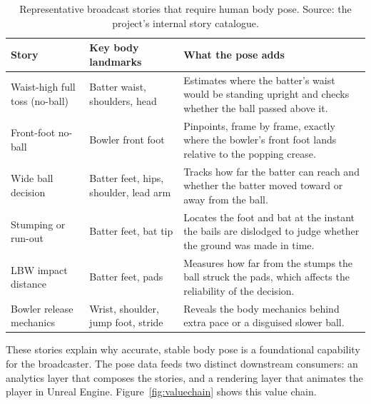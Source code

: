 \documentclass[oneside,openany]{book}
\begin{document}
\begin{table}[!h]
	\begin{center}
		\caption{Representative broadcast stories that require human body pose. Source: the
		project's internal story catalogue.}
		\label{tab:stories}
		\footnotesize
		\begin{tabular}{p{3.4cm}p{4.0cm}p{6.6cm}}
			\toprule
			\textbf{Story} & \textbf{Key body landmarks} & \textbf{What the pose adds} \\
			\midrule
			Waist-high full toss (no-ball) & Batter waist, shoulders, head & Estimates where the
			batter's waist would be standing upright and checks whether the ball passed above it. \\
			Front-foot no-ball & Bowler front foot & Pinpoints, frame by frame, exactly where the
			bowler's front foot lands relative to the popping crease. \\
			Wide ball decision & Batter feet, hips, shoulder, lead arm & Tracks how far the batter
			can reach and whether the batter moved toward or away from the ball. \\
			Stumping or run-out & Batter feet, bat tip & Locates the foot and bat at the instant the
			bails are dislodged to judge whether the ground was made in time. \\
			LBW impact distance & Batter feet, pads & Measures how far from the stumps the ball
			struck the pads, which affects the reliability of the decision. \\
			Bowler release mechanics & Wrist, shoulder, jump foot, stride & Reveals the body
			mechanics behind extra pace or a disguised slower ball. \\
			\bottomrule
		\end{tabular}
	\end{center}
\end{table}

These stories explain why accurate, stable body pose is a foundational capability for the
broadcaster. The pose data feeds two distinct downstream consumers: an analytics layer that
composes the stories, and a rendering layer that animates the player in Unreal Engine.
Figure~\ref{fig:valuechain} shows this value chain.
\end{document}
